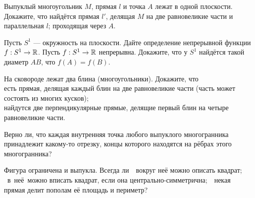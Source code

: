 \documentclass[a4paper,11pt]{article}
\begin{document}



 Выпуклый многоугольник $M$, прямая $l$ и точка $A$ лежат в одной
плоскости. Докажите, что найдётся прямая $l'$, делящая $M$ на две равновеликие части и
 параллельная $l$;
 проходящая через $A$.


 Пусть $S^1$ --- окружность на плоскости.
Дайте определение
непрерывной функции $f:S^1\rightarrow\mathbb{R}$.
Пусть $f:S^1\rightarrow\mathbb{R}$ непрерывна.
Докажите, что %
у $S^1$ найд\"ется такой диаметр $AB$, что
$f(A)=f(B)$.

 На сковороде лежат два блина (многоугольники). Докажите, что\\
есть прямая, делящая каждый блин на две равновеликие части
(часть может состоять из многих кусков);\\
найдутся две перпендикулярные прямые, делящие первый блин
на четыре равновеликие части.


 Верно ли, что каждая внутренняя точка любого выпуклого многогранника
принадлежит какому-то отрезку, концы которого находятся на р\"ебрах этого
многогранника?

Фигура ограничена и выпукла. Всегда ли $\!\!\!$
 $\!\!\!$ вокруг неё можно описать квадрат;   $\!\!\!$
 $\!\!\!$~в~неё~можно вписать квадрат, если она центрально-симметрична; $\!\!\!$
 $\!\!\!$ некая прямая делит пополам её площадь и периметр?




\end{document}
